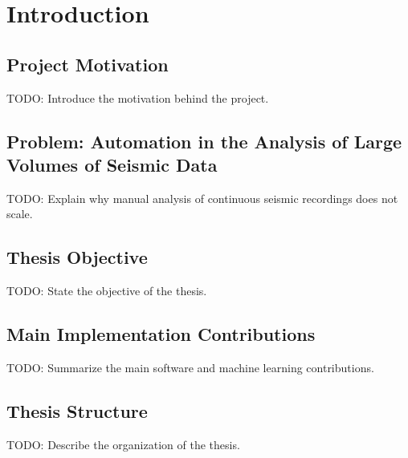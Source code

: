 \chapter{Introduction}

\section{Project Motivation}
TODO: Introduce the motivation behind the project.

\section{Problem: Automation in the Analysis of Large Volumes of Seismic Data}
TODO: Explain why manual analysis of continuous seismic recordings does not scale.

\section{Thesis Objective}
TODO: State the objective of the thesis.

\section{Main Implementation Contributions}
TODO: Summarize the main software and machine learning contributions.

\section{Thesis Structure}
TODO: Describe the organization of the thesis.
